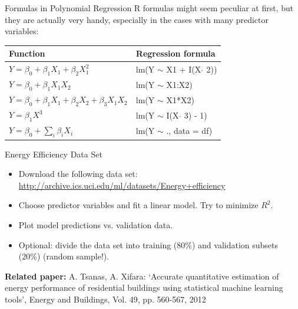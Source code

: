 \begin{frame}{Formulas in Polynomial Regression}
    R formulas might seem peculiar at first, but they are actually very handy,
    especially in the cases with many predictor variables:
    \vspace*{1cm}

    \begin{tabular}{l l}
        Function & Regression formula \\ \hline
        $Y = \beta_0 + \beta_1 X_1 + \beta_2 X_1^2$ & lm(Y $\sim$ X1 + I(X $\hat{}$ 2))\\
        $Y = \beta_0 + \beta_1 X_1 X_2$ & lm(Y $\sim$ X1:X2) \\
        $Y = \beta_0 + \beta_1 X_1 + \beta_2 X_2 + \beta_3 X_1 X_2$ & lm(Y $\sim$ X1*X2) \\
        $Y = \beta_1 X^3$ & lm(Y $\sim$ I(X $\hat{}$ 3) - 1) \\
        $Y = \beta_0 + \sum_i \beta_i X_i$ & lm(Y $\sim$ ., data = df)
    \end{tabular}
\end{frame}

\begin{frame}{Energy Efficiency Data Set}
    \begin{example}
        \begin{itemize}
            \item Download the following data set:\\
            {\small \url{http://archive.ics.uci.edu/ml/datasets/Energy+efficiency}}
            \item Choose predictor variables and fit a linear model. Try to minimize $R^2$.
            \item Plot model predictions vs. validation data.
            \item Optional: divide the data set into training (80\%) and validation subsets (20\%) (random sample!).
        \end{itemize}

        {\small \textbf{Related paper:} A. Tsanas, A. Xifara: `Accurate quantitative estimation of energy performance of residential buildings using statistical machine learning tools', Energy and Buildings, Vol. 49, pp. 560-567, 2012}
    \end{example}
\end{frame}

